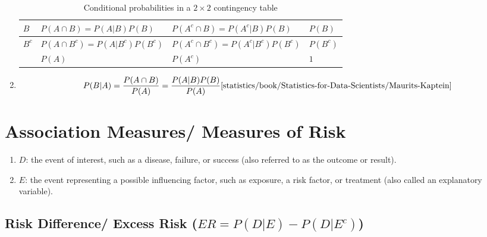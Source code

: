 \begin{enumerate}
\begin{customArrayStretch}{1.2}
\begin{table}[H]
\begin{tabular}{|l||l|l|l|}
                  $B$ & $P (A \cap B) = P (A|B) P (B)$ & $P (A^c \cap B) = P (A^c|B) P (B)$ & $P (B)$ \\
                  \hline
                  
                  $B^c$ & $P (A \cap B^c) = P (A|B^c) P (B^c)$ & $P (A^c \cap B^c) = P (A^c|B^c) P (B^c)$ & $P (B^c)$ \\
                  \hline
                  
                  & $P (A)$ & $P (A^c)$ & $1$ \\
                  \hline
            \end{tabular}
            \caption{Conditional probabilities in a $2 \times 2$ contingency table \cite{statistics/book/Statistics-for-Data-Scientists/Maurits-Kaptein}}
        \end{table}
    \end{customArrayStretch}

    \item 
    \begin{theorem}
        \[
            P(B|A) 
            = \dfrac{P(A\cap B)}{P(A)} = \dfrac{P(A|B) P(B)}{P(A)}
            \text{\cite{statistics/book/Statistics-for-Data-Scientists/Maurits-Kaptein}}
        \]
    \end{theorem}
\end{enumerate}




\section{Association Measures/ Measures of Risk}

\begin{enumerate}
    \item $D$: the event of interest, such as a disease, failure, or success (also referred to as the outcome or result).
    \hfill \cite{statistics/book/Statistics-for-Data-Scientists/Maurits-Kaptein, common/online/chatgpt}

    \item $E$: the event representing a possible influencing factor, such as exposure, a risk factor, or treatment (also called an explanatory variable).
    \hfill \cite{statistics/book/Statistics-for-Data-Scientists/Maurits-Kaptein, common/online/chatgpt}
\end{enumerate}

\subsection{Risk Difference/ Excess Risk ($ER = P(D|E) - P(D|E^c)$)}

